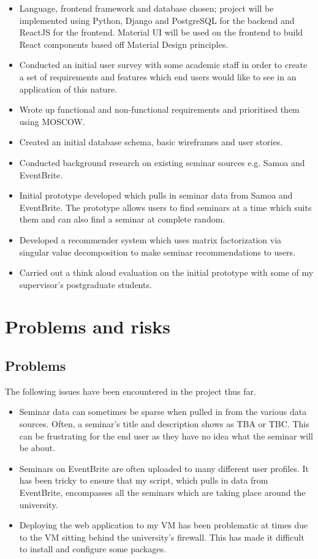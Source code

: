 \documentclass[11pt]{article}
\begin{document}
\begin{itemize}
\tightlist
\item Language, frontend framework and database chosen; project will be implemented using Python, Django and PostgreSQL for the backend and ReactJS for the frontend. Material UI will be used on the frontend to build React components based off Material Design principles.
\item Conducted an initial user survey with some academic staff in order to create a set of requirements and features which end users would like to see in an application of this nature.
\item Wrote up functional and non-functional requirements and prioritised them using MOSCOW.
\item Created an initial database schema, basic wireframes and user stories.
\item Conducted background research on existing seminar sources e.g. Samoa and EventBrite.
\item Initial prototype developed which pulls in seminar data from Samoa and EventBrite. The prototype allows users to find seminars at a time which suits them and can also find a seminar at complete random.
\item Developed a recommender system which uses matrix factorization via singular value decomposition to make seminar recommendations to users.
\item Carried out a think aloud evaluation on the initial prototype with some of my supervisor's postgraduate students.
\end{itemize}

\section{Problems and risks}\label{problems-and-risks}

\subsection{Problems}\label{problems}

The following issues have been encountered in the project thus far.
\begin{itemize}
\tightlist
\item Seminar data can sometimes be sparse when pulled in from the various data sources. Often, a seminar's title and description shows as TBA or TBC. This can be frustrating for the end user as they have no idea what the seminar will be about.
\item Seminars on EventBrite are often uploaded to many different user profiles. It has been tricky to ensure that my script, which pulls in data from EventBrite, encompasses all the seminars which are taking place around the university.
\item Deploying the web application to my VM has been problematic at times due to the VM sitting behind the university's firewall. This has made it difficult to install and configure some packages.
\end{itemize}
\end{document}
